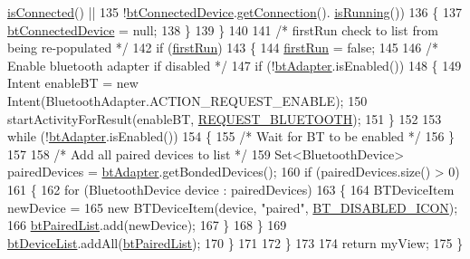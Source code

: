 \begin{DoxyCode}
      \hyperlink{class_android_app_1_1_b_t_connection_a1c91fcddfe9f3b69cd0141742103191a}{isConnected}() ||
135                         !\hyperlink{class_android_app_1_1_pair_device_fragment_ac3d93a383672355ed54c56dc3e21e827}{btConnectedDevice}.\hyperlink{class_android_app_1_1_b_t_device_item_af256e53bf23dd3f969b14e0566a7b785}{getConnection}().
      \hyperlink{class_android_app_1_1_b_t_connection_a88abb39350aef278f15e54be4d0d1df3}{isRunning}())
136                 \{
137                     \hyperlink{class_android_app_1_1_pair_device_fragment_ac3d93a383672355ed54c56dc3e21e827}{btConnectedDevice} = null;
138                 \}
139             \}
140 
141             \textcolor{comment}{/* firstRun check to list from being re-populated */}
142             \textcolor{keywordflow}{if} (\hyperlink{class_android_app_1_1_pair_device_fragment_aab068c156fe3ef60bcb35328b697ba99}{firstRun})
143             \{
144                 \hyperlink{class_android_app_1_1_pair_device_fragment_aab068c156fe3ef60bcb35328b697ba99}{firstRun} = \textcolor{keyword}{false};
145 
146                 \textcolor{comment}{/* Enable bluetooth adapter if disabled */}
147                 \textcolor{keywordflow}{if} (!\hyperlink{class_android_app_1_1_pair_device_fragment_a54c71cf078647dbcd55742fc31a0a191}{btAdapter}.isEnabled())
148                 \{
149                     Intent enableBT = \textcolor{keyword}{new} Intent(BluetoothAdapter.ACTION\_REQUEST\_ENABLE);
150                     startActivityForResult(enableBT, \hyperlink{class_android_app_1_1_pair_device_fragment_a6d3f89529498ff90429ca5c74de2b177}{REQUEST\_BLUETOOTH});
151                 \}
152 
153                 \textcolor{keywordflow}{while} (!\hyperlink{class_android_app_1_1_pair_device_fragment_a54c71cf078647dbcd55742fc31a0a191}{btAdapter}.isEnabled())
154                 \{
155                     \textcolor{comment}{/* Wait for BT to be enabled */}
156                 \}
157 
158                 \textcolor{comment}{/* Add all paired devices to list */}
159                 Set<BluetoothDevice> pairedDevices = \hyperlink{class_android_app_1_1_pair_device_fragment_a54c71cf078647dbcd55742fc31a0a191}{btAdapter}.getBondedDevices();
160                 \textcolor{keywordflow}{if} (pairedDevices.size() > 0)
161                 \{
162                     \textcolor{keywordflow}{for} (BluetoothDevice device : pairedDevices)
163                     \{
164                         BTDeviceItem newDevice =
165                             \textcolor{keyword}{new} BTDeviceItem(device, \textcolor{stringliteral}{"paired"}, \hyperlink{class_android_app_1_1_pair_device_fragment_a68e4843e20a0d81574ba3d9e78a67be5}{BT\_DISABLED\_ICON});
166                         \hyperlink{class_android_app_1_1_pair_device_fragment_ab87b3da6318565e92d422a84685ab5b2}{btPairedList}.add(newDevice);
167                     \}
168                 \}
169                 \hyperlink{class_android_app_1_1_pair_device_fragment_ac375aedac2d098332a1af1cf696f50a3}{btDeviceList}.addAll(\hyperlink{class_android_app_1_1_pair_device_fragment_ab87b3da6318565e92d422a84685ab5b2}{btPairedList});
170             \}
171 
172         \}
173 
174         \textcolor{keywordflow}{return} myView;
175     \}
\end{DoxyCode}
